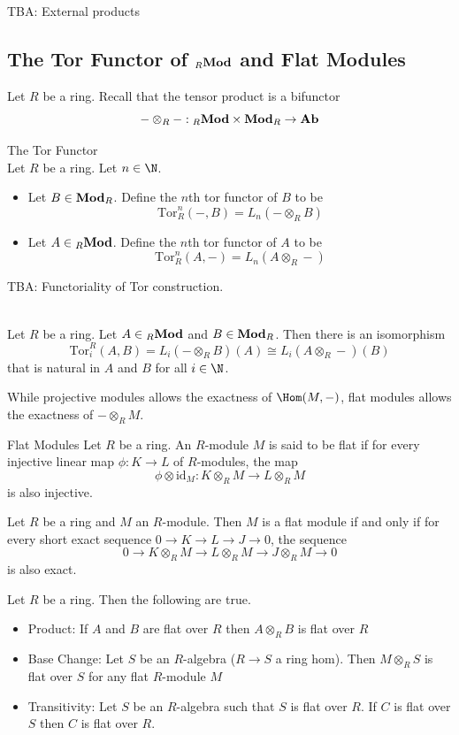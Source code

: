 \documentclass[a4paper]{article}
\begin{document}
TBA: External products

\subsection{The Tor Functor of ${_R}\bold{Mod}$ and Flat Modules}
Let $R$ be a ring. Recall that the tensor product is a bifunctor $$-\otimes_R-:{_R\bold{Mod}}\times\bold{Mod}_R\to\bold{Ab}$$

\begin{defn}{The Tor Functor}{}\\
Let $R$ be a ring. Let $n\in\N$. 
\begin{itemize}
\item Let $B\in\bold{Mod}_R$. Define the $n$th tor functor of $B$ to be $$\text{Tor}_R^n(-,B)=L_n(-\otimes_RB)$$
\item Let $A\in{_R\bold{Mod}}$. Define the $n$th tor functor of $A$ to be $$\text{Tor}_R^n(A,-)=L_n(A\otimes_R-)$$
\end{itemize}
\end{defn}

TBA: Functoriality of Tor construction. 

\begin{prp}{}{}\\
Let $R$ be a ring. Let $A\in{_R\bold{Mod}}$ and $B\in\bold{Mod}_R$. Then there is an isomorphism $$\text{Tor}_i^R(A,B)=L_i(-\otimes_RB)(A)\cong L_i(A\otimes_R-)(B)$$ that is natural in $A$ and $B$ for all $i\in\N$. 
\end{prp}
While projective modules allows the exactness of $\Hom(M,-)$, flat modules allows the exactness of $-\otimes_RM$. 

\begin{defn}{Flat Modules}{} Let $R$ be a ring. An $R$-module $M$ is said to be flat if for every injective linear map $\phi:K\to L$ of $R$-modules, the map $$\phi\otimes\text{id}_M:K\otimes_RM\to L\otimes_RM$$ is also injective. 
\end{defn}

\begin{prp}{}{} Let $R$ be a ring and $M$ an $R$-module. Then $M$ is a flat module if and only if for every short exact sequence $0\to K\to L\to J\to 0$, the sequence $$0\to K\otimes_RM\to L\otimes_RM\to J\otimes_RM\to 0$$ is also exact. 
\end{prp}

\begin{prp}{}{} Let $R$ be a ring. Then the following are true. 
\begin{itemize}
\item Product: If $A$ and $B$ are flat over $R$ then $A\otimes_R B$ is flat over $R$
\item Base Change: Let $S$ be an $R$-algebra ($R\to S$ a ring hom). Then $M\otimes_RS$ is flat over $S$ for any flat $R$-module $M$
\item Transitivity: Let $S$ be an $R$-algebra such that $S$ is flat over $R$. If $C$ is flat over $S$ then $C$ is flat over $R$. 
\end{itemize}
\end{prp}
\end{document}
